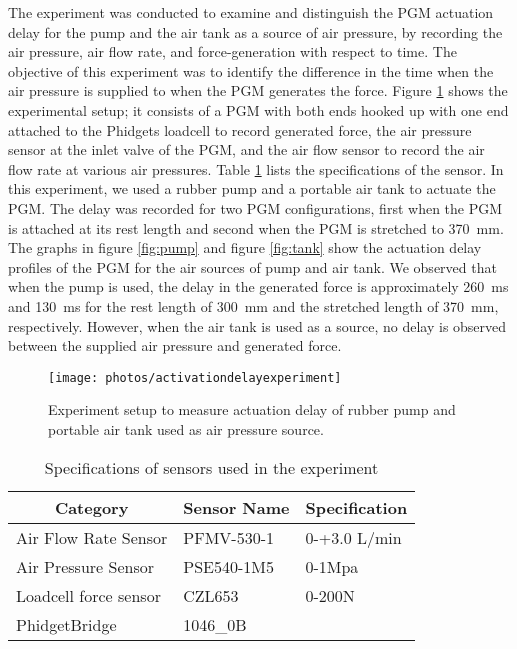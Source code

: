 \documentclass[paper,JRM,paper]{jaciiiarticle}
\begin{document}
The experiment was conducted to examine and distinguish the PGM actuation delay for the pump and the air tank as a source of air pressure, by recording the air pressure, air flow rate, and force-generation with respect to time. The objective of this experiment was to identify the difference in the time when the air pressure is supplied to when the PGM generates the force. Figure \ref{fig:activationdelayexperiment} shows the experimental setup; it consists of a PGM with both ends hooked up with one end attached to the Phidgets loadcell to record generated force, the air pressure sensor at the inlet valve of the PGM, and the air flow sensor to record the air flow rate at various air pressures. Table \ref{sensordetails} lists the specifications of the sensor. In this experiment, we used a rubber pump and a portable air tank to actuate the PGM. The delay was recorded for two PGM configurations, first when the PGM is attached at its rest length and second when the PGM is stretched to  \SI{370}{\milli\meter}. The graphs in figure \ref{fig:pump} and figure \ref{fig:tank} show the actuation delay profiles of the PGM for the air sources of pump and air tank. We observed that when the pump is used, the delay in the generated force is approximately \SI{260}{\milli\second} and \SI{130}{\milli\second} for the rest length of \SI{300}{\milli\meter} and the stretched length of \SI{370}{\milli\meter}, respectively. However, when the air tank is used as a source, no delay is observed between the supplied air pressure and generated force.

\begin{figure}
	\centering
	\texttt{[image: photos/activationdelayexperiment]}
	\caption{Experiment setup to measure actuation delay of rubber pump and portable air tank used as air pressure source.}
	\label{fig:activationdelayexperiment}
\end{figure}

\begin{table}[]
	\begin{tabular}{@{}lll@{}}
		\toprule
		\multicolumn{1}{c}{Category} & \multicolumn{1}{c}{Sensor Name} & \multicolumn{1}{c}{Specification} \\ \midrule
		Air Flow Rate Sensor & PFMV-530-1  & 0-+3.0 L/min \\
		Air Pressure Sensor & PSE540-1M5  & 0-1Mpa \\
		Loadcell force sensor & CZL653   & 0-200N \\
		PhidgetBridge & 1046\_0B  &  \\ \bottomrule
	\end{tabular}
	\caption{Specifications of sensors used in the experiment}
	\label{sensordetails}
\end{table}
\end{document}
